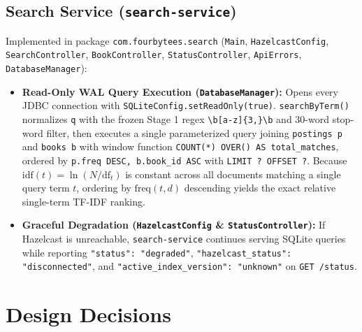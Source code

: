 \documentclass[10pt,a4paper]{article}
\begin{document}
\subsection{Search Service (\texttt{search-service})}
Implemented in package \texttt{com.fourbytees.search} (\texttt{Main}, \texttt{HazelcastConfig}, \texttt{SearchController}, \texttt{BookController}, \texttt{StatusController}, \texttt{ApiErrors}, \texttt{DatabaseManager}):
\begin{itemize}[leftmargin=*,nosep]
    \item \textbf{Read-Only WAL Query Execution (\texttt{DatabaseManager}):} Opens every JDBC connection with \texttt{SQLiteConfig.setReadOnly(true)}. \texttt{searchByTerm()} normalizes \texttt{q} with the frozen Stage 1 regex \texttt{\textbackslash b[a-z]\{3,\}\textbackslash b} and 30-word stop-word filter, then executes a single parameterized query joining \texttt{postings p} and \texttt{books b} with window function \texttt{COUNT(*) OVER() AS total\_matches}, ordered by \texttt{p.freq DESC, b.book\_id ASC} with \texttt{LIMIT ? OFFSET ?}. Because $\text{idf}(t) = \ln(N / \text{df}_t)$ is constant across all documents matching a single query term $t$, ordering by $\text{freq}(t, d)$ descending yields the exact relative single-term TF-IDF ranking.
    \item \textbf{Graceful Degradation (\texttt{HazelcastConfig} \& \texttt{StatusController}):} If Hazelcast is unreachable, \texttt{search-service} continues serving SQLite queries while reporting \texttt{"status": "degraded"}, \texttt{"hazelcast\_status": "disconnected"}, and \texttt{"active\_index\_version": "unknown"} on \texttt{GET /status}.
\end{itemize}

\section{Design Decisions}
\label{sec:design_decisions}
\end{document}
